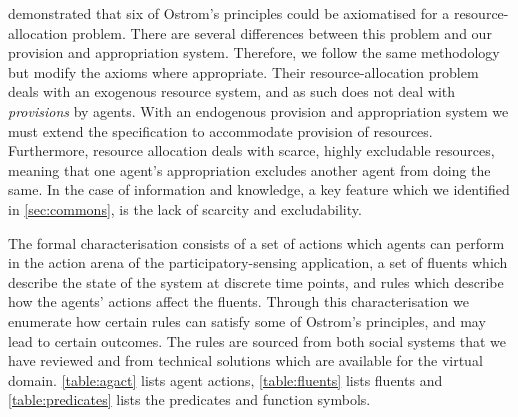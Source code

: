  demonstrated that six of Ostrom's principles could be axiomatised for a resource-allocation problem. There are several differences between this problem and our provision and appropriation system. 
Therefore, we follow the same methodology but modify the axioms where appropriate. 
Their resource-allocation problem deals with an exogenous resource system, and as such does not deal with \emph{provisions} by agents. With an endogenous provision and appropriation system we must extend the specification to accommodate provision of resources.
Furthermore, resource allocation deals with scarce, highly excludable resources, meaning that  one agent's appropriation excludes another agent from doing the same. 
In the case of information and knowledge, a key feature which we identified in \autoref{sec:commons}, is the lack of scarcity and excludability. 

The formal characterisation consists of a set of actions which agents can perform in the action arena of the participatory-sensing application, a set of fluents which describe the state of the system at discrete time points, and rules which describe how the agents' actions affect the fluents. Through this characterisation we enumerate how certain rules can satisfy some of Ostrom's principles, and may lead to certain outcomes. The rules are sourced from both social systems that we have reviewed and from technical solutions which are available for the virtual domain. \autoref{table:agact} lists agent actions, \autoref{table:fluents} lists fluents and \autoref{table:predicates} lists the
predicates and function symbols.

